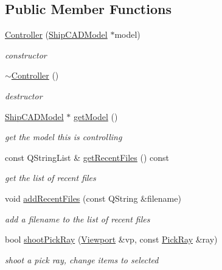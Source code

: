 \subsection*{Public Member Functions}
\begin{DoxyCompactItemize}
\item 
\hyperlink{classShipCAD_1_1Controller_a969bc231a8d15189a717acbca9146deb}{Controller} (\hyperlink{classShipCAD_1_1ShipCADModel}{Ship\-C\-A\-D\-Model} $\ast$model)
\begin{DoxyCompactList}\small\item\em constructor \end{DoxyCompactList}\item 
\hyperlink{classShipCAD_1_1Controller_a0ab87934c4f7a266cfdb86e0f36bc1b5}{$\sim$\-Controller} ()
\begin{DoxyCompactList}\small\item\em destructor \end{DoxyCompactList}\item 
\hyperlink{classShipCAD_1_1ShipCADModel}{Ship\-C\-A\-D\-Model} $\ast$ \hyperlink{classShipCAD_1_1Controller_a7868a3bac4ed86abff1fe5a0fabb4abd}{get\-Model} ()
\begin{DoxyCompactList}\small\item\em get the model this is controlling \end{DoxyCompactList}\item 
const Q\-String\-List \& \hyperlink{classShipCAD_1_1Controller_a3188f9f9d040945547e93005c1ce316e}{get\-Recent\-Files} () const 
\begin{DoxyCompactList}\small\item\em get the list of recent files \end{DoxyCompactList}\item 
void \hyperlink{classShipCAD_1_1Controller_aea72d61d10bd8eb70572438696ada3d3}{add\-Recent\-Files} (const Q\-String \&filename)
\begin{DoxyCompactList}\small\item\em add a filename to the list of recent files \end{DoxyCompactList}\item 
bool \hyperlink{classShipCAD_1_1Controller_ae09ac41e86659fab53e236f27f2ca761}{shoot\-Pick\-Ray} (\hyperlink{classShipCAD_1_1Viewport}{Viewport} \&vp, const \hyperlink{structShipCAD_1_1PickRay}{Pick\-Ray} \&ray)
\begin{DoxyCompactList}\small\item\em shoot a pick ray, change items to selected \end{DoxyCompactList}\end{DoxyCompactItemize}


